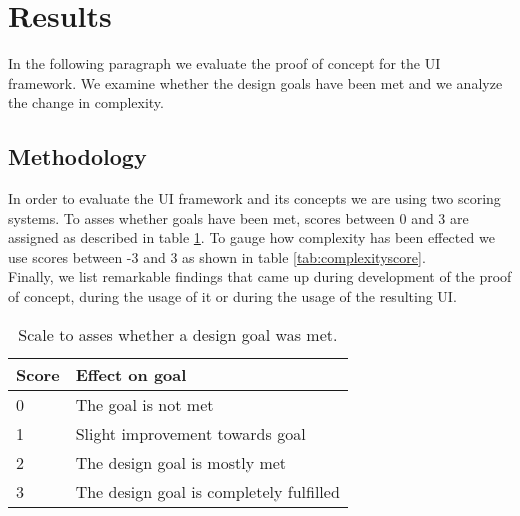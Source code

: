 \section{Results}\label{sec:results}
In the following paragraph we evaluate the proof of concept for the UI framework. We examine whether the design goals have been met and we analyze the change in complexity.

\subsection{Methodology}
In order to evaluate the UI framework and its concepts we are using two scoring systems. To asses whether goals have been met, scores between 0 and 3 are assigned as described in table \ref{tab:designgoalsscore}. To gauge how complexity has been effected we use scores between -3 and 3 as shown in table \ref{tab:complexityscore}. \\
Finally, we list remarkable findings that came up during development of the proof of concept, during the usage of it or during the usage of the resulting UI.

\begin{table}[!htb]
  \begin{center}
    \begin{tabular}{|l|l|}
      \hline
      \textbf{Score} & \textbf{Effect on goal} \\
      \hline
      0 & The goal is not met \\
      \hline
      1 & Slight improvement towards goal \\
      \hline
      2 & The design goal is mostly met \\
      \hline
      3 & The design goal is completely fulfilled \\
      \hline
    \end{tabular}
    \caption{Scale to asses whether a design goal was met.}
    \label{tab:designgoalsscore}
  \end{center}
\end{table}


